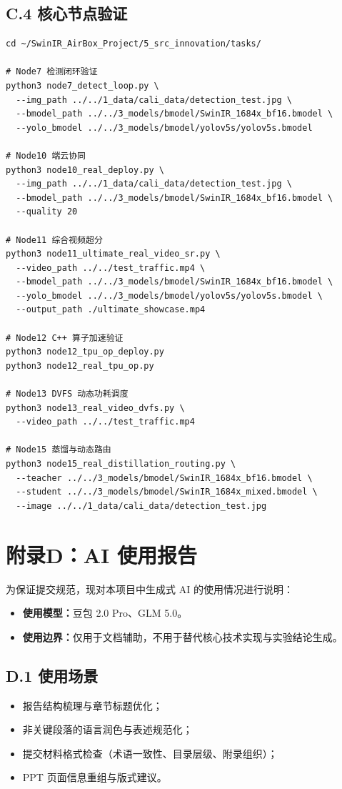 \documentclass[12pt,a4paper]{ctexart}
\begin{document}
\subsection*{C.4 核心节点验证}
\begin{verbatim}
cd ~/SwinIR_AirBox_Project/5_src_innovation/tasks/

# Node7 检测闭环验证
python3 node7_detect_loop.py \
  --img_path ../../1_data/cali_data/detection_test.jpg \
  --bmodel_path ../../3_models/bmodel/SwinIR_1684x_bf16.bmodel \
  --yolo_bmodel ../../3_models/bmodel/yolov5s/yolov5s.bmodel

# Node10 端云协同
python3 node10_real_deploy.py \
  --img_path ../../1_data/cali_data/detection_test.jpg \
  --bmodel_path ../../3_models/bmodel/SwinIR_1684x_bf16.bmodel \
  --quality 20

# Node11 综合视频超分
python3 node11_ultimate_real_video_sr.py \
  --video_path ../../test_traffic.mp4 \
  --bmodel_path ../../3_models/bmodel/SwinIR_1684x_bf16.bmodel \
  --yolo_bmodel ../../3_models/bmodel/yolov5s/yolov5s.bmodel \
  --output_path ./ultimate_showcase.mp4

# Node12 C++ 算子加速验证
python3 node12_tpu_op_deploy.py
python3 node12_real_tpu_op.py

# Node13 DVFS 动态功耗调度
python3 node13_real_video_dvfs.py \
  --video_path ../../test_traffic.mp4

# Node15 蒸馏与动态路由
python3 node15_real_distillation_routing.py \
  --teacher ../../3_models/bmodel/SwinIR_1684x_bf16.bmodel \
  --student ../../3_models/bmodel/SwinIR_1684x_mixed.bmodel \
  --image ../../1_data/cali_data/detection_test.jpg
\end{verbatim}
\section*{附录D：AI 使用报告}

为保证提交规范，现对本项目中生成式 AI 的使用情况进行说明：
\begin{itemize}
  \item \textbf{使用模型：}豆包 2.0 Pro、GLM 5.0。
  \item \textbf{使用边界：}仅用于文档辅助，不用于替代核心技术实现与实验结论生成。
\end{itemize}

\subsection*{D.1 使用场景}
\begin{itemize}
  \item 报告结构梳理与章节标题优化；
  \item 非关键段落的语言润色与表述规范化；
  \item 提交材料格式检查（术语一致性、目录层级、附录组织）；
  \item PPT 页面信息重组与版式建议。
\end{itemize}
\end{document}
